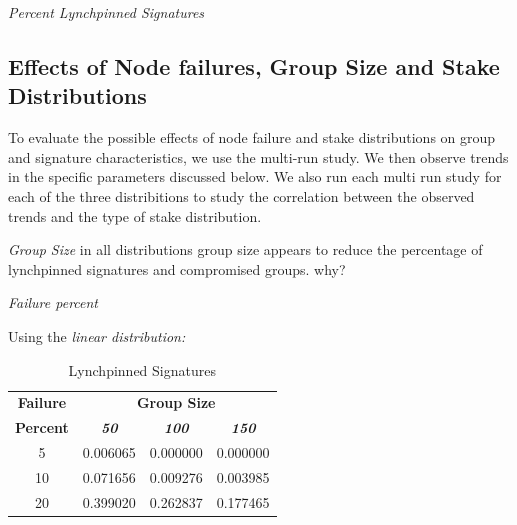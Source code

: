 \documentclass[conference]{IEEEtran}
\begin{document}
\textit{Percent Lynchpinned Signatures}

\subsection{Effects of Node failures, Group Size and Stake Distributions}
To evaluate the possible effects of node failure and stake distributions on group and signature 
characteristics, we use the multi-run study. We then observe trends in the specific parameters 
discussed below. We also run each multi run study for each of the three distribitions to study 
the correlation between the observed trends and the type of stake distribution.

\textit{Group Size} in all distributions group size appears to reduce the percentage
of lynchpinned signatures and compromised groups. why?

\textit{Failure percent}


    Using the \textit{linear distribution:} 

        \begin{table}[h!]
            \caption{Lynchpinned Signatures}
            \begin{center}
            \begin{tabular}{|c|c|c|c|}
            \hline
            \textbf{Failure}&\multicolumn{3}{|c|}{\textbf{Group Size}} \\
            \cline{2-4} 
            \textbf{Percent} & \textbf{\textit{50}}& \textbf{\textit{100}}& \textbf{\textit{150}} \\
            \hline
            5 &  0.006065 &  0.000000 &  0.000000 \\
            \hline
            10 &  0.071656 &  0.009276 &  0.003985 \\
            \hline
            20 &  0.399020 &  0.262837 &  0.177465 \\
            \hline
            \end{tabular}
            \label{lynchpinned_table1}
            \end{center}
        \end{table}
\end{document}
